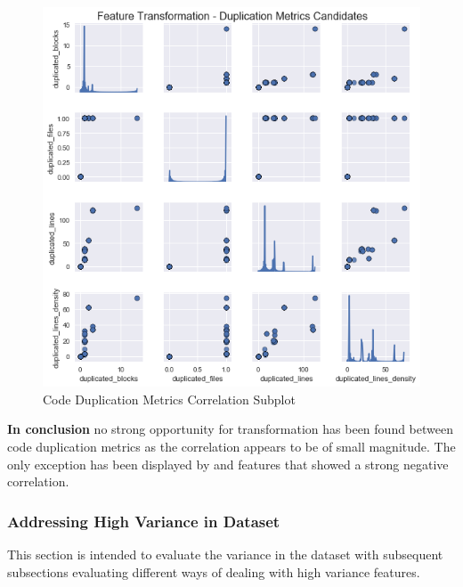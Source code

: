 \begin{figure}
    \centering
    \includegraphics[scale=0.75]{Figures/correlation/Attribute_Relationship_in_Duplication_Metrics.png}
    \caption{Code Duplication Metrics Correlation Subplot}
    \label{fig:correlation-code-duplication-metrics-subplot}
\end{figure}


\textbf{In conclusion} no strong opportunity for transformation has been found between code duplication metrics as the correlation appears to be of small magnitude. The only exception has been displayed by \duplicatedBlocks{} and \duplicatedFiles{} features that showed a strong negative correlation.
\FloatBarrier

\subsubsection{Addressing High Variance in Dataset}\label{sec:impl-data-analysis:dealing-with-variance}
This section is intended to evaluate the variance in the dataset with subsequent subsections evaluating different ways of dealing with high variance features.